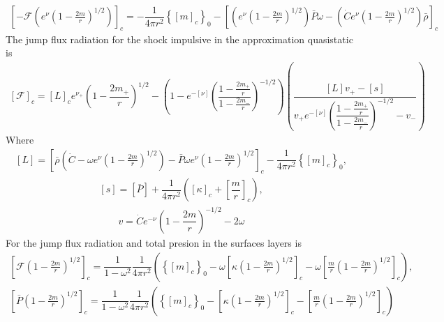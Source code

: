 \documentclass[notitlepage,letterpaper, 10pt]{article}
\begin{document}
\begin{eqnarray}
    \left[ -\mathcal{F}\left( e^{\nu}\left( 1- \frac{2m}{r} \right)^{1/2} \right)  \right]_{c} =  -\dfrac{1}{4\pi r^{2}} \left\lbrace \left[ m \right]_c   \right\rbrace_0 - \left[\left(e^{\nu}\left( 1- \frac{2m}{r} \right)^{1/2}\right)\bar{P}\omega - \left( \dot{C}e^{\nu}\left( 1- \frac{2m}{r} \right)^{1/2} \right)\bar{\rho}  \right]_{c}
\end{eqnarray}
The jump flux radiation for the shock impulsive in the approximation quasistatic is
\begin{eqnarray}
    \left[ \mathcal{F}\right]_{c} = \left[ L\right]_{c} e^{\nu_{+}} \left( 1- \dfrac{2m_{+}}{r}\right)^{1/2}- \left( 1- e^{-\left[ \nu \right]}\left(   \dfrac{1-\frac{2m_{+}}{r}}{1-\frac{2m_{-}}{r}}\right)^{-1/2}\right)\left(\dfrac{\left[ L \right]v_{+}-\left[  s\right]}{v_{+} e^{-\left[ \nu \right]}\left(   \dfrac{1-\frac{2m_{+}}{r}}{1-\frac{2m_{-}}{r}}\right)^{-1/2}-v_{-}} \right)
    \label{shockImplFlux}
\end{eqnarray}
Where 
\begin{eqnarray}
    \left[L \right]= \left[ \bar{\rho}\left(  \dot{C}- \omega e^{\nu}\left(1-\frac{2m}{r} \right)^{1/2}\right) - \bar{P}\omega e^{\nu}\left(1-\frac{2m}{r} \right)^{1/2}\right]_{c}-\dfrac{1}{4\pi r^{2}} \left\lbrace \left[ m \right]_c   \right\rbrace_0,
\end{eqnarray}
\begin{eqnarray}
    \left[ s \right]=  \left[ \bar{P} \right]+ \dfrac{1}{4\pi r^{2}}\left( \left[ \kappa \right]_{c}+ \left[ \dfrac{m}{r} \right]_{c} \right),
    \label{S}
\end{eqnarray}
\begin{eqnarray}
   v= \dot{C}e^{-\nu}\left( 1-\dfrac{2m}{r}\right)^{-1/2}- 2\omega
   \label{V}
\end{eqnarray}
For the jump flux radiation  and total presion in the surfaces layers is 
\begin{eqnarray}
   \left[\mathcal{F}\left( 1- \frac{2m}{r} \right)^{1/2}   \right]_{c}= \dfrac{1}{1-\omega^{2}}\dfrac{1}{4\pi r^{2}}\left( \left\lbrace \left[ m \right]_c   \right\rbrace_0- \omega\left[\kappa\left( 1- \frac{2m}{r} \right)^{1/2}\right]_{c}- \omega \left[ \frac{m}{r}\left( 1- \frac{2m}{r} \right)^{1/2} \right]_{c} \right),
   \label{fluxSurface}
\end{eqnarray}
\begin{eqnarray}
 \left[\bar{P}\left( 1- \frac{2m}{r} \right)^{1/2}   \right]_{c}= \dfrac{1}{1-\omega^{2}}\dfrac{1}{4\pi r^{2}}\left( \left\lbrace \left[ m \right]_c   \right\rbrace_0- \left[\kappa\left( 1- \frac{2m}{r} \right)^{1/2}\right]_{c}- \left[ \frac{m}{r}\left( 1- \frac{2m}{r} \right)^{1/2} \right]_{c} \right)
\end{eqnarray}
\end{document}
